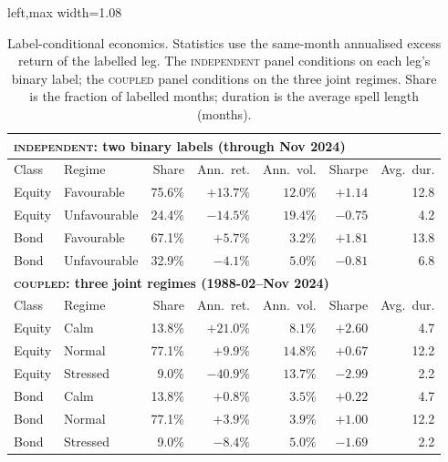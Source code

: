 \documentclass[10pt]{article}
\newcommand{\Acoup}{\textsc{coupled}}
\newcommand{\Bindep}{\textsc{independent}}
\begin{document}
\begin{table}[H]
\caption{Label-conditional economics. Statistics use the same-month annualised excess return
of the labelled leg. The \Bindep{} panel conditions on each leg's binary label; the \Acoup{}
panel conditions on the three joint regimes. Share is the fraction of labelled months;
duration is the average spell length (months).}
\label{tab:state-economics}
\small
\begin{adjustbox}{left,max width=1.08\textwidth}
\begin{tabular}{@{}llrrrrr@{}}
\toprule
\multicolumn{7}{l}{\textbf{\Bindep{}: two binary labels (through Nov 2024)}}\\
\midrule
Class & Regime & Share & Ann.\ ret. & Ann.\ vol. & Sharpe & Avg.\ dur. \\
\midrule
Equity & Favourable   & 75.6\% & $+13.7\%$ & $12.0\%$ & $+1.14$ & 12.8 \\
Equity & Unfavourable & 24.4\% & $-14.5\%$ & $19.4\%$ & $-0.75$ & \phantom{0}4.2 \\
Bond   & Favourable   & 67.1\% & $+5.7\%$  & $3.2\%$  & $+1.81$ & 13.8 \\
Bond   & Unfavourable & 32.9\% & $-4.1\%$  & $5.0\%$  & $-0.81$ & \phantom{0}6.8 \\
\midrule
\multicolumn{7}{l}{\textbf{\Acoup{}: three joint regimes (1988-02--Nov 2024)}}\\
\midrule
Class & Regime & Share & Ann.\ ret. & Ann.\ vol. & Sharpe & Avg.\ dur. \\
\midrule
Equity & Calm     & 13.8\% & $+21.0\%$ & $8.1\%$  & $+2.60$ & \phantom{0}4.7 \\
Equity & Normal   & 77.1\% & $+9.9\%$  & $14.8\%$ & $+0.67$ & 12.2 \\
Equity & Stressed & \phantom{0}9.0\% & $-40.9\%$ & $13.7\%$ & $-2.99$ & \phantom{0}2.2 \\
Bond   & Calm     & 13.8\% & $+0.8\%$  & $3.5\%$  & $+0.22$ & \phantom{0}4.7 \\
Bond   & Normal   & 77.1\% & $+3.9\%$  & $3.9\%$  & $+1.00$ & 12.2 \\
Bond   & Stressed & \phantom{0}9.0\% & $-8.4\%$  & $5.0\%$  & $-1.69$ & \phantom{0}2.2 \\
\bottomrule
\end{tabular}
\end{adjustbox}
\end{table}
\end{document}
